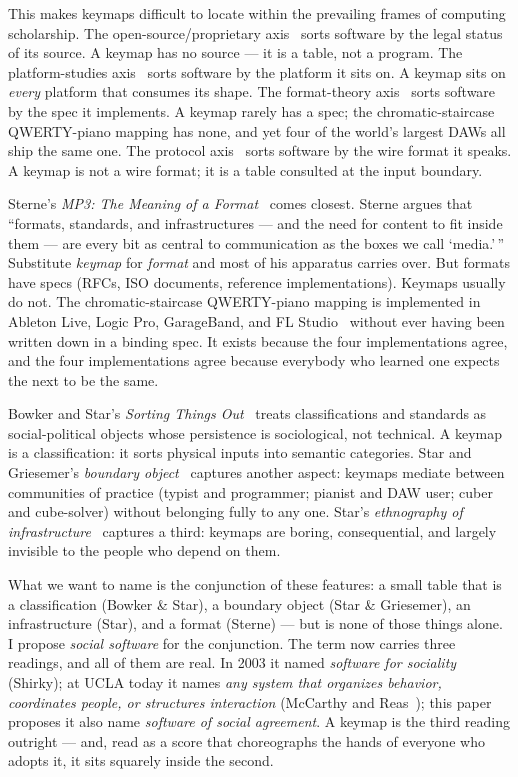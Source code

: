 \documentclass[10pt,letterpaper,twocolumn]{article}
\begin{document}
This makes keymaps difficult to locate within the prevailing frames of computing scholarship. The open-source/proprietary axis~\citep{galloway2004protocol} sorts software by the legal status of its source. A keymap has no source --- it is a table, not a program. The platform-studies axis~\citep{nieborg2018platformization} sorts software by the platform it sits on. A keymap sits on \emph{every} platform that consumes its shape. The format-theory axis~\citep{sterne2012mp3} sorts software by the spec it implements. A keymap rarely has a spec; the chromatic-staircase QWERTY-piano mapping has none, and yet four of the world's largest DAWs all ship the same one. The protocol axis~\citep{galloway2004protocol} sorts software by the wire format it speaks. A keymap is not a wire format; it is a table consulted at the input boundary.

Sterne's \emph{MP3: The Meaning of a Format}~\citep{sterne2012mp3} comes closest. Sterne argues that ``formats, standards, and infrastructures --- and the need for content to fit inside them --- are every bit as central to communication as the boxes we call `media.'\,'' Substitute \emph{keymap} for \emph{format} and most of his apparatus carries over. But formats have specs (RFCs, ISO documents, reference implementations). Keymaps usually do not. The chromatic-staircase QWERTY-piano mapping is implemented in Ableton Live, Logic Pro, GarageBand, and FL Studio~\citep{ableton_musical_typing,apple_logic_musicaltyping,imageline_typing_piano} without ever having been written down in a binding spec. It exists because the four implementations agree, and the four implementations agree because everybody who learned one expects the next to be the same.

Bowker and Star's \emph{Sorting Things Out}~\citep{bowker1999sorting} treats classifications and standards as social-political objects whose persistence is sociological, not technical. A keymap is a classification: it sorts physical inputs into semantic categories. Star and Griesemer's \emph{boundary object}~\citep{star1989boundary} captures another aspect: keymaps mediate between communities of practice (typist and programmer; pianist and DAW user; cuber and cube-solver) without belonging fully to any one. Star's \emph{ethnography of infrastructure}~\citep{star1999ethnography} captures a third: keymaps are boring, consequential, and largely invisible to the people who depend on them.

What we want to name is the conjunction of these features: a small table that is a classification (Bowker \& Star), a boundary object (Star \& Griesemer), an infrastructure (Star), and a format (Sterne) --- but is none of those things alone. I propose \emph{social software} for the conjunction. The term now carries three readings, and all of them are real. In 2003 it named \emph{software for sociality} (Shirky); at UCLA today it names \emph{any system that organizes behavior, coordinates people, or structures interaction} (McCarthy and Reas~\citep{sosoft_info}); this paper proposes it also name \emph{software of social agreement}. A keymap is the third reading outright --- and, read as a score that choreographs the hands of everyone who adopts it, it sits squarely inside the second.
\end{document}
